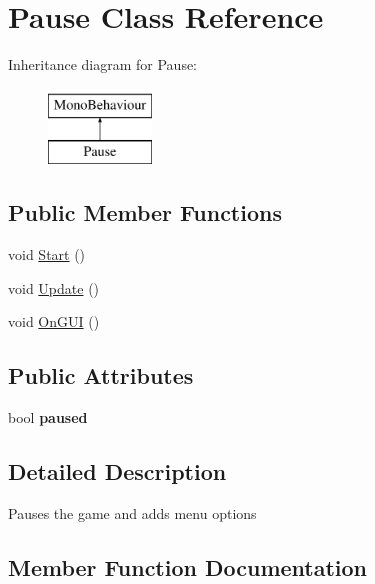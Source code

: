 \hypertarget{class_pause}{}\section{Pause Class Reference}
\label{class_pause}
Inheritance diagram for Pause\+:\begin{figure}[H]
\begin{center}
\leavevmode
\includegraphics[height=2.000000cm]{class_pause}
\end{center}
\end{figure}
\subsection*{Public Member Functions}
\begin{DoxyCompactItemize}
\item 
void \mbox{\hyperlink{class_pause_a2676d511f741a690dd8a1d6f64aef89c}{Start}} ()
\item 
void \mbox{\hyperlink{class_pause_aab062f8945cc0bad08b554ad58357dc5}{Update}} ()
\item 
void \mbox{\hyperlink{class_pause_a7c2e0304ced82527cf7f676c92b16a7c}{On\+G\+UI}} ()
\end{DoxyCompactItemize}
\subsection*{Public Attributes}
\begin{DoxyCompactItemize}
\item 
\mbox{\label{class_pause_aa5274c1fe482791dd670f1db1ec19600}} 
bool {\bfseries paused}
\end{DoxyCompactItemize}


\subsection{Detailed Description}
Pauses the game and adds menu options 

\subsection{Member Function Documentation}
\mbox{\label{class_pause_a7c2e0304ced82527cf7f676c92b16a7c}} 
